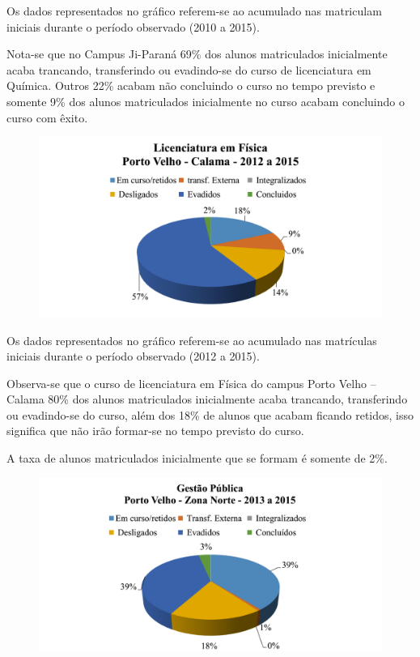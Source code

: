 \documentclass[article,12pt,onesidea,4paper,english,brazil]{abntex2}
\begin{document}
	Os dados representados no gráfico referem-se ao acumulado nas matriculam iniciais
	durante o período observado (2010 a 2015).
	
	Nota-se que no Campus Ji-Paraná 69\% dos alunos matriculados inicialmente acaba
	trancando, transferindo ou evadindo-se do curso de licenciatura em Química. Outros 22\% acabam
	não concluindo o curso no tempo previsto e somente 9\% dos alunos matriculados inicialmente no
	curso acabam concluindo o curso com êxito.
	
	\begin{figure}[ht]
		\centering
		\includegraphics[width=0.8\linewidth]{pip-97-12}
	\end{figure}
	
	Os dados representados no gráfico referem-se ao acumulado nas matrículas iniciais durante o
	período observado (2012 a 2015).
	
	Observa-se que o curso de licenciatura em Física do campus Porto Velho – Calama 80\% dos
	alunos matriculados inicialmente acaba trancando, transferindo ou evadindo-se do curso, além dos
	18\% de alunos que acabam ficando retidos, isso significa que não irão formar-se no tempo
	previsto do curso.
	
	A taxa de alunos matriculados inicialmente que se formam é somente de 2\%.
	
	\begin{figure}[ht]
		\centering
		\includegraphics[width=0.8\linewidth]{pip-97-13}
	\end{figure}
	
\end{document}
